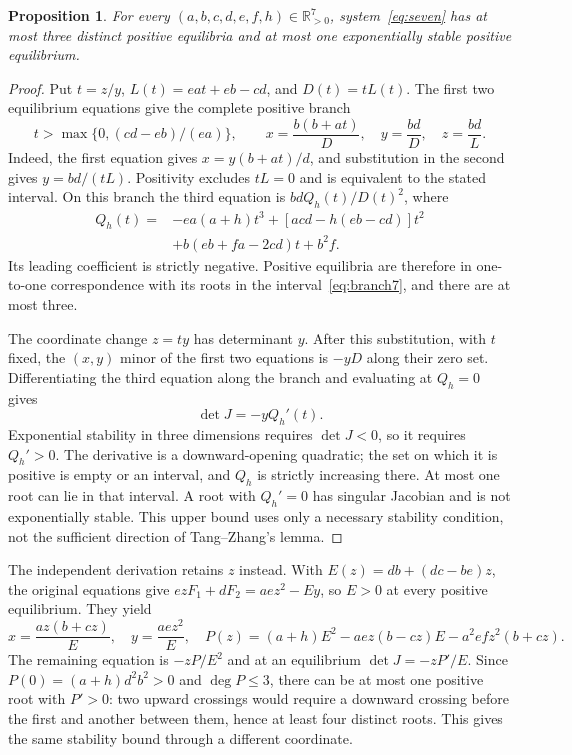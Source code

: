 \documentclass[11pt,a4paper]{article}
\newtheorem{proposition}[theorem]{Proposition}
\newcommand{\Rp}{\mathbb R_{>0}}
\begin{document}
\begin{proposition}\label{prop:seven}
For every $(a,b,c,d,e,f,h)\in\Rp^7$, system~\eqref{eq:seven}
has at most three distinct positive equilibria and at most one
exponentially stable positive equilibrium.
\end{proposition}
\begin{proof}
Put $t=z/y$, $L(t)=ea t+eb-cd$, and $D(t)=tL(t)$.
The first two equilibrium equations give the complete positive
branch
\begin{equation}\label{eq:branch7}
 t>\max\{0,(cd-eb)/(ea)\},\qquad
 x=\frac{b(b+at)}D,\quad y=\frac{bd}D,\quad z=\frac{bd}L.
\end{equation}
Indeed, the first equation gives $x=y(b+at)/d$, and substitution
in the second gives $y=bd/(tL)$. Positivity excludes $tL=0$
and is equivalent to the stated interval. On this branch the
third equation is $bd Q_h(t)/D(t)^2$, where
\begin{equation}\label{eq:q7}
\begin{split}
 Q_h(t)={}&-ea(a+h)t^3+[acd-h(eb-cd)]t^2\\
          &+b(eb+fa-2cd)t+b^2f.
\end{split}
\end{equation}
Its leading coefficient is strictly negative. Positive equilibria
are therefore in one-to-one correspondence with its roots in
the interval~\eqref{eq:branch7}, and there are at most three.

The coordinate change $z=ty$ has determinant $y$. After this
substitution, with $t$ fixed, the $(x,y)$ minor of the first two
equations is $-yD$ along their zero set. Differentiating
the third equation along the branch and evaluating at $Q_h=0$
gives
\begin{equation}\label{eq:det7}
 \det J=-yQ_h'(t).
\end{equation}
Exponential stability in three dimensions requires $\det J<0$,
so it requires $Q_h'>0$. The derivative is a downward-opening
quadratic; the set on which it is positive is empty or an interval, and
$Q_h$ is strictly increasing there. At most one root can lie in
that interval. A root with $Q_h'=0$ has singular Jacobian and
is not exponentially stable. This upper bound uses only a
necessary stability condition, not the sufficient direction of
Tang--Zhang's lemma.
\end{proof}

The independent derivation retains $z$ instead. With
$E(z)=db+(dc-be)z$, the original equations give
$ezF_1+dF_2=ae z^2-Ey$, so $E>0$ at every positive equilibrium.
They yield
\[
 x=\frac{az(b+cz)}E,\quad y=\frac{ae z^2}E,\quad
 P(z)=(a+h)E^2-aez(b-cz)E-a^2efz^2(b+cz).
\]
The remaining equation is $-zP/E^2$ and at an equilibrium
$\det J=-zP'/E$. Since $P(0)=(a+h)d^2b^2>0$ and $\deg P\leq3$,
there can be at most one positive root with $P'>0$: two upward
crossings would require a downward crossing before the first
and another between them, hence at least four distinct roots.
This gives the same stability bound through a different coordinate.
\end{document}
